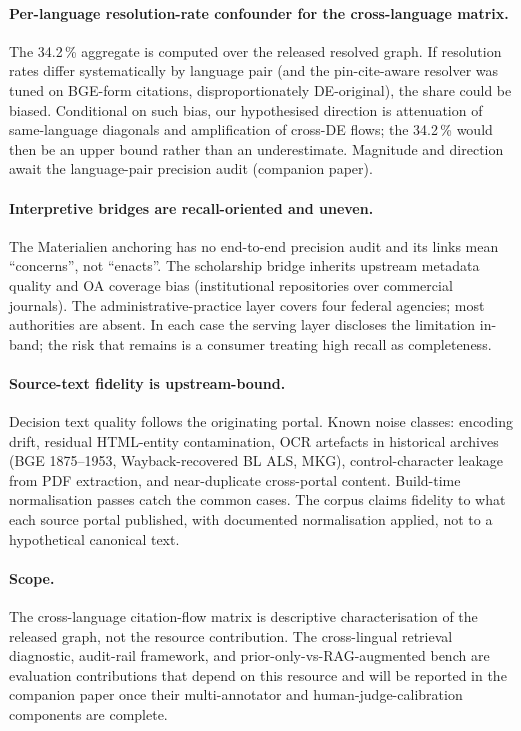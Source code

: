 \documentclass[11pt,a4paper]{article}
\begin{document}
\paragraph{Per-language resolution-rate confounder for the cross-language matrix.} The 34.2\,\% aggregate is computed over the released resolved graph. If resolution rates differ systematically by language pair (and the pin-cite-aware resolver was tuned on BGE-form citations, disproportionately DE-original), the share could be biased. Conditional on such bias, our hypothesised direction is attenuation of same-language diagonals and amplification of cross-DE flows; the 34.2\,\% would then be an upper bound rather than an underestimate. Magnitude and direction await the language-pair precision audit (companion paper).

\paragraph{Interpretive bridges are recall-oriented and uneven.} The Materialien anchoring has no end-to-end precision audit and its links mean ``concerns'', not ``enacts''. The scholarship bridge inherits upstream metadata quality and OA coverage bias (institutional repositories over commercial journals). The administrative-practice layer covers four federal agencies; most authorities are absent. In each case the serving layer discloses the limitation in-band; the risk that remains is a consumer treating high recall as completeness.

\paragraph{Source-text fidelity is upstream-bound.} Decision text quality follows the originating portal. Known noise classes: encoding drift, residual HTML-entity contamination, OCR artefacts in historical archives (BGE 1875--1953, Wayback-recovered BL ALS, MKG), control-character leakage from PDF extraction, and near-duplicate cross-portal content. Build-time normalisation passes catch the common cases. The corpus claims fidelity to what each source portal published, with documented normalisation applied, not to a hypothetical canonical text.

\paragraph{Scope.} The cross-language citation-flow matrix is descriptive characterisation of the released graph, not the resource contribution. The cross-lingual retrieval diagnostic, audit-rail framework, and prior-only-vs-RAG-augmented bench are evaluation contributions that depend on this resource and will be reported in the companion paper once their multi-annotator and human-judge-calibration components are complete.
\end{document}
